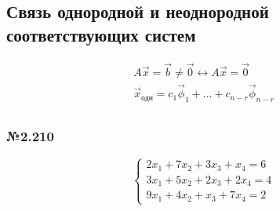 \documentclass{article}
\begin{document}
\subsection{Связь однородной и неоднородной \\
соответствующих систем}

\begin{gather*}
	A \vec{x} = \vec{b} \ne \vec{0} \leftrightarrow A \vec{x} = \vec{0} \\
	\vec{x}_{\text{одн}} = c_1 \vec{\phi}_1 + \dots + c_{n-r} \vec{\phi}_{n-r} \\ 
\end{gather*}

\subsubsection*{№2.210}

\[
	\begin{cases}
		2x_1 + 7x_2 + 3x_3 + x_4 = 6 \\
		3x_1 + 5x_2 + 2x_3 + 2x_4 = 4 \\
		9x_1 + 4x_2 + x_3 + 7x_4 = 2
	\end{cases}
\]
\end{document}
